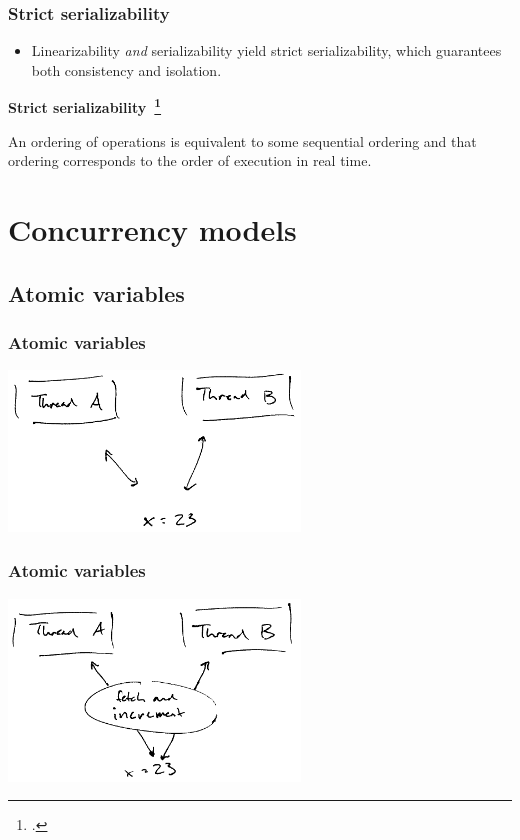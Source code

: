 \documentclass[aspectratio=1610]{beamer}
\begin{document}
  \begin{frame}
    \frametitle{Strict serializability}

    \begin{itemize}
      \item Linearizability \emph{and} serializability yield strict serializability, which guarantees both consistency and isolation.
    \end{itemize}

    \vfill

    \textbf{Strict serializability~\footcite{Herlihy1990}}

    An ordering of operations is equivalent to some sequential ordering and that ordering corresponds to the order of execution in real time.
  \end{frame}

  \section{Concurrency models}

  \subsection{Atomic variables}

  \begin{frame}
    \frametitle{Atomic variables}
    \centering

    \includegraphics[width=220pt]{../figures/nonatomic}
  \end{frame}

  \begin{frame}
    \frametitle{Atomic variables}
    \centering

    \includegraphics[width=220pt]{../figures/atomic}
  \end{frame}
\end{document}
